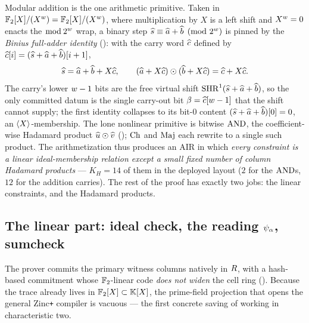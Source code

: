 Modular addition is the one arithmetic primitive. Taken in
$\mathbb{F}_2[X]/(X^{w}) = \mathbb{F}_2[X]/(X^{w})$, where multiplication by $X$ is a left shift
and $X^{w} = 0$ enacts the $\bmod\,2^{w}$ wrap, a binary step
$\widehat{s} \equiv \widehat{a} + \widehat{b} \pmod{2^{w}}$ is pinned by the
\emph{Binius full-adder identity} (): with the carry word
$\widehat{c}$ defined by $\widehat{c}[i] = (\widehat{s}+\widehat{a}+\widehat{b})[i+1]$,
\begin{equation}
  \label{eq:ov-binius}
  \widehat{s} = \widehat{a} + \widehat{b} + X\widehat{c},
  \qquad
  (\widehat{a} + X\widehat{c}) \odot (\widehat{b} + X\widehat{c}) = \widehat{c} + X\widehat{c}.
\end{equation}
The carry's lower $w-1$ bits are the free virtual shift
$\operatorname{SHR}^{1}(\widehat{s}+\widehat{a}+\widehat{b})$, so the only committed datum is the single
carry-out bit $\beta = \widehat{c}[w-1]$ that the shift cannot supply; the first
identity collapses to its bit-$0$ content $(\widehat{s}+\widehat{a}+\widehat{b})[0]=0$, an
$\langle X \rangle$-membership. The lone nonlinear primitive is bitwise $\operatorname{AND}$, the
coefficient-wise Hadamard product $\widehat{u}\odot\widehat{v}$ (); $\operatorname{Ch}$ and
$\operatorname{Maj}$ each rewrite to a single such product. The arithmetization thus produces
an AIR in which \emph{every constraint is a linear ideal-membership relation
except a small fixed number of column Hadamard products} --- $K_H = 14$ of them
in the deployed layout ($2$ for the $\operatorname{AND}$s, $12$ for the addition carries). The
rest of the proof has exactly two jobs: the linear constraints, and the
Hadamard products.

\subsection{The linear part: ideal check, the reading $\psi_{\alpha}$, sumcheck}
\label{sec:overview-linear}

The prover commits the primary witness columns natively in $R$, with a
hash-based commitment whose $\mathbb{F}_2$-linear code \emph{does not widen} the cell
ring (). Because the trace already lives in
$\mathbb{F}_2[X]\subset\mathbb{K}[X]$, the prime-field projection that opens the general
Zinc\texttt{+} compiler is vacuous --- the first concrete saving of working in
characteristic two.

